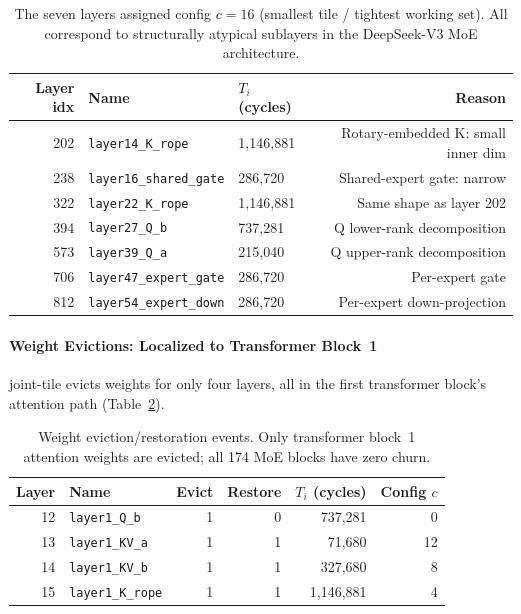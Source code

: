 \begin{table}[h]
\centering
\caption{The seven layers assigned config $c=16$ (smallest tile /
tightest working set).
All correspond to structurally atypical sublayers
in the DeepSeek-V3 MoE architecture.}
\label{tab:ds_outliers}
\begin{tabular}{rllr}
\toprule
\textbf{Layer idx} & \textbf{Name} &
\textbf{$T_i$ (cycles)} & \textbf{Reason} \\
\midrule
202 & \texttt{layer14\_K\_rope}      & 1{,}146{,}881 & Rotary-embedded K: small inner dim \\
238 & \texttt{layer16\_shared\_gate} &   286{,}720   & Shared-expert gate: narrow \\
322 & \texttt{layer22\_K\_rope}      & 1{,}146{,}881 & Same shape as layer 202 \\
394 & \texttt{layer27\_Q\_b}         &   737{,}281   & Q lower-rank decomposition \\
573 & \texttt{layer39\_Q\_a}         &   215{,}040   & Q upper-rank decomposition \\
706 & \texttt{layer47\_expert\_gate} &   286{,}720   & Per-expert gate \\
812 & \texttt{layer54\_expert\_down} &   286{,}720   & Per-expert down-projection \\
\bottomrule
\end{tabular}
\end{table}

\paragraph{Weight Evictions: Localized to Transformer Block~1}

joint-tile evicts weights for only four layers, all in the first transformer block's attention path (Table~\ref{tab:ds_evictions}).

\begin{table}[h]
\centering
\caption{Weight eviction/restoration events. Only transformer block~1
attention weights are evicted; all 174 MoE blocks have zero churn.}
\label{tab:ds_evictions}
\begin{tabular}{rlrrrr}
\toprule
\textbf{Layer} & \textbf{Name} &
\textbf{Evict} & \textbf{Restore} &
\textbf{$T_i$ (cycles)} & \textbf{Config $c$} \\
\midrule
12 & \texttt{layer1\_Q\_b}   & 1 & 0 & 737{,}281   & 0  \\
13 & \texttt{layer1\_KV\_a}  & 1 & 1 &  71{,}680   & 12 \\
14 & \texttt{layer1\_KV\_b}  & 1 & 1 & 327{,}680   &  8 \\
15 & \texttt{layer1\_K\_rope}& 1 & 1 & 1{,}146{,}881 & 4 \\
\bottomrule
\end{tabular}
\end{table}

